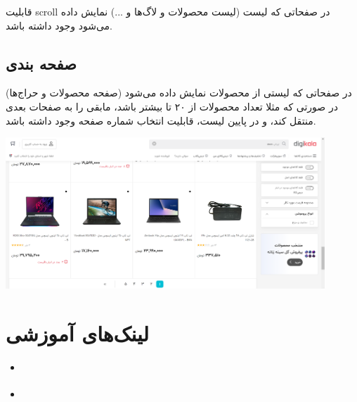 \documentclass[]{article}
\begin{document}
قابلیت scroll در صفحاتی که لیست (لیست محصولات و لاگ‌ها و ...) نمایش داده می‌شود وجود داشته باشد.


\newpage

\subsection*{{\titr صفحه بندی  }}


در صفحاتی که لیستی از محصولات نمایش داده می‌شود (صفحه محصولات و حراج‌ها) در صورتی که مثلا تعداد محصولات از ۲۰ تا بیشتر باشد، مابقی را به صفحات بعدی منتقل کند، و در پایین لیست، قابلیت انتخاب شماره صفحه وجود داشته باشد.


 \begin{center}
\includegraphics[width=0.9\textwidth]{images/image35.png}
\end{center}


\section*{{\titr لینک‌های آموزشی }}

\begin{itemize}

\item
\href{https://www.javatpoint.com/javafx-tutorial}{\textcolor{blue}{\underline{}}}

\item
\href{https://www.tutorialspoint.com/javafx/index.htm}{\textcolor{blue}{\underline{}}}

\end{itemize}
\end{document}
